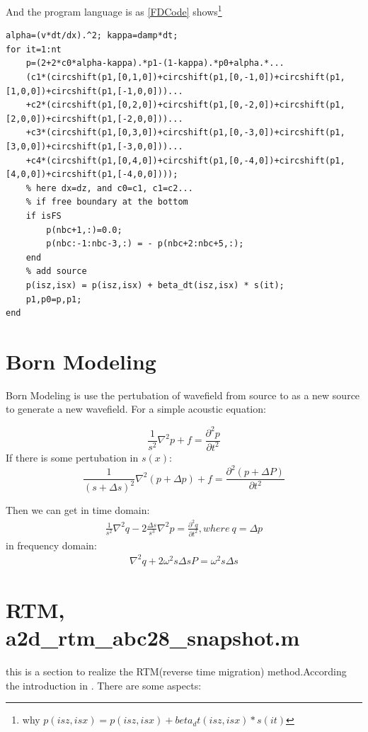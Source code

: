\documentclass[a4paper]{article}
\begin{document}
		And the program language is as \autoref{FDCode} shows\footnote{why $p(isz,isx) = p(isz,isx) + beta_dt(isz,isx) * s(it)$}
		\begin{lstlisting}[caption=set ABC to the velocity variable (2 is same), label=FDCode,basicstyle=\tiny, numberstyle=\tiny]
% 
alpha=(v*dt/dx).^2; kappa=damp*dt;
for it=1:nt
	p=(2+2*c0*alpha-kappa).*p1-(1-kappa).*p0+alpha.*...
	(c1*(circshift(p1,[0,1,0])+circshift(p1,[0,-1,0])+circshift(p1,[1,0,0])+circshift(p1,[-1,0,0]))...
	+c2*(circshift(p1,[0,2,0])+circshift(p1,[0,-2,0])+circshift(p1,[2,0,0])+circshift(p1,[-2,0,0]))...
	+c3*(circshift(p1,[0,3,0])+circshift(p1,[0,-3,0])+circshift(p1,[3,0,0])+circshift(p1,[-3,0,0]))...
	+c4*(circshift(p1,[0,4,0])+circshift(p1,[0,-4,0])+circshift(p1,[4,0,0])+circshift(p1,[-4,0,0]))); 
	% here dx=dz, and c0=c1, c1=c2...
	% if free boundary at the bottom
	if isFS
		p(nbc+1,:)=0.0;
		p(nbc:-1:nbc-3,:) = - p(nbc+2:nbc+5,:);
	end
	% add source
	p(isz,isx) = p(isz,isx) + beta_dt(isz,isx) * s(it);
	p1,p0=p,p1;
end
    	\end{lstlisting}

\section{Born Modeling}

	Born Modeling is use the pertubation of wavefield from source to as a new source to generate a new wavefield. For a simple acoustic equation:
	
	$$\frac{1}{s^2} \nabla^2p + f = \frac{\partial^2 p}{\partial t^2}$$
	If there is some pertubation in $s(x)$:
	$$\frac{1}{(s+\Delta s)^2} \nabla^2(p+\Delta p) + f = \frac{\partial^2 (p+\Delta P)}{\partial t^2}$$

	Then we can get in time domain:
	\begin{align}
		\frac{1}{s^2} \nabla^2q - 2\frac{\Delta s}{s^3}\nabla^2p = \frac{\partial^2 q}{\partial t^2}, where\ q=\Delta p
 	\end{align}
	in frequency domain:
	\begin{align}
		\nabla^2q + 2\omega^2 s\Delta s P= \omega^2 s\Delta s
	\end{align}

\section{RTM, a2d\_rtm\_abc28\_snapshot.m}	
	this is a section to realize the RTM(reverse time migration) method.According the introduction in \cite[Schuster 2015]{SI}. There are some aspects:
\end{document}
